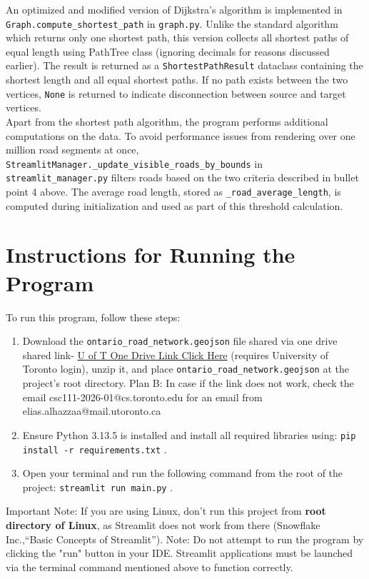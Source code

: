 \documentclass[fontsize=11pt]{article}
\begin{document}
An optimized and modified version of Dijkstra's algorithm is implemented in \texttt{Graph.compute\_shortest\_path} in \texttt{graph.py}. Unlike the standard algorithm which returns only one shortest path, this version collects all shortest paths of equal length using PathTree class (ignoring decimals for reasons discussed earlier). The result is returned as a \texttt{ShortestPathResult} dataclass containing the shortest length and all equal shortest paths. If no path exists between the two vertices, \texttt{None} is returned to indicate disconnection between source and target vertices. \\

Apart from the shortest path algorithm, the program performs additional computations on the data. To avoid performance issues from rendering over one million road segments at once, \texttt{StreamlitManager.\_update\_visible\_roads\_by\_bounds} in \texttt{streamlit\_manager.py} filters roads based on the two criteria described in bullet point 4 above. The average road length, stored as \texttt{\_road\_average\_length}, is computed during initialization and used as part of this threshold calculation.


\section*{Instructions for Running the Program}

To run this program, follow these steps:

\begin{enumerate}
    \item Download the \texttt{ontario\_road\_network.geojson} file shared via one drive shared link- \href{https://utoronto-my.sharepoint.com/:u:/g/personal/fayiz_ali_mail_utoronto_ca/IQDhtKu1wot5Q4vNBEP51VLGAetT_JvGxjJON6AUmDvsyq4}{U of T One Drive Link Click Here} (requires University of Toronto login), unzip it, and place \texttt{ontario\_road\_network.geojson} at the project's root directory. Plan B: In case if the link does not work, check the email csc111-2026-01@cs.toronto.edu for an email from elias.alhazzaa@mail.utoronto.ca 
    \item Ensure Python 3.13.5 is installed and install all required libraries using: \texttt{pip install -r requirements.txt} .
    \item Open your terminal and run the following command from the root of the project: \texttt{streamlit run main.py} .
\end{enumerate}
Important Note: If you are using Linux, don't run this project from \textbf{root directory of Linux}, as Streamlit does not work from there (Snowflake Inc.,“Basic Concepts of Streamlit”). 
Note: Do not attempt to run the program by clicking the "run" button in your IDE. Streamlit applications must be launched via the terminal command mentioned above to function correctly.
\end{document}
